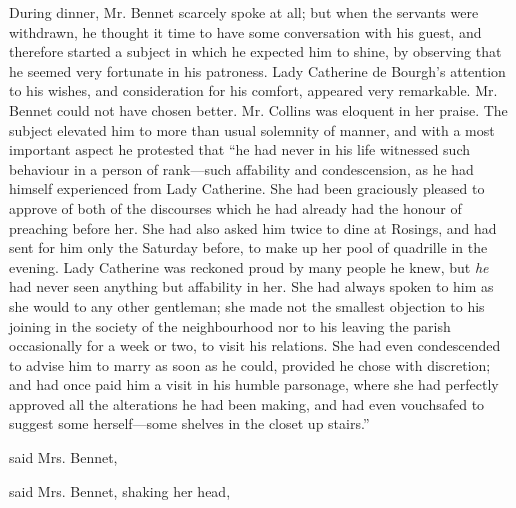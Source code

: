 During dinner, Mr. Bennet scarcely spoke at all; but when the servants were withdrawn, he thought it time to have some conversation with his guest, and therefore started a subject in which he expected him to shine, by observing that he seemed very fortunate in his patroness. Lady Catherine de Bourgh's attention to his wishes, and consideration for his comfort, appeared very remarkable. Mr. Bennet could not have chosen better. Mr. Collins was eloquent in her praise. The subject elevated him to more than usual solemnity of manner, and with a most important aspect he protested that “he had never in his life witnessed such behaviour in a person of rank---such affability and condescension, as he had himself experienced from Lady Catherine. She had been graciously pleased to approve of both of the discourses which he had already had the honour of preaching before her. She had also asked him twice to dine at Rosings, and had sent for him only the Saturday before, to make up her pool of quadrille in the evening. Lady Catherine was reckoned proud by many people he knew, but {\em he} had never seen anything but affability in her. She had always spoken to him as she would to any other gentleman; she made not the smallest objection to his joining in the society of the neighbourhood nor to his leaving the parish occasionally for a week or two, to visit his relations. She had even condescended to advise him to marry as soon as he could, provided he chose with discretion; and had once paid him a visit in his humble parsonage, where she had perfectly approved all the alterations he had been making, and had even vouchsafed to suggest some herself---some shelves in the closet up stairs.”

 said Mrs. Bennet, 




 said Mrs. Bennet, shaking her head, 

